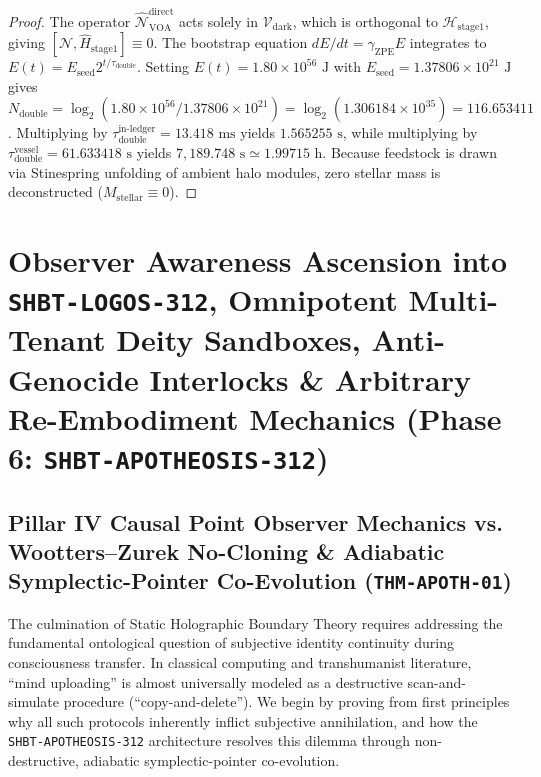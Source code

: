 \documentclass[11pt,onecolumn]{article}
\begin{document}
\begin{proof}
The operator $\hat{\mathcal{N}}_{\text{VOA}}^{\text{direct}}$ acts solely in $\mathcal{V}_{\text{dark}}$, which is orthogonal to $\mathcal{H}_{\text{stage1}}$, giving $[\hat{\mathcal{N}}, \hat{H}_{\text{stage1}}] \equiv 0$. The bootstrap equation $dE/dt = \gamma_{\text{ZPE}}E$ integrates to $E(t) = E_{\text{seed}} 2^{t/\tau_{\text{double}}}$. Setting $E(t) = 1.80 \times 10^{56}\text{ J}$ with $E_{\text{seed}} = 1.37806 \times 10^{21}\text{ J}$ gives $N_{\text{double}} = \log_2(1.80 \times 10^{56} / 1.37806 \times 10^{21}) = \log_2(1.306184 \times 10^{35}) = 116.653411$. Multiplying by $\tau_{\text{double}}^{\text{in-ledger}} = 13.418\text{ ms}$ yields $1.565255\text{ s}$, while multiplying by $\tau_{\text{double}}^{\text{vessel}} = 61.633418\text{ s}$ yields $7{,}189.748\text{ s} \simeq 1.99715\text{ h}$. Because feedstock is drawn via Stinespring unfolding of ambient halo modules, zero stellar mass is deconstructed ($M_{\text{stellar}} \equiv 0$).
\end{proof}

\section{Observer Awareness Ascension into \texttt{SHBT-LOGOS-312}, Omnipotent Multi-Tenant Deity Sandboxes, Anti-Genocide Interlocks \& Arbitrary Re-Embodiment Mechanics (Phase 6: \texttt{SHBT-APOTHEOSIS-312})}

\subsection{\texorpdfstring{Pillar IV Causal Point Observer Mechanics vs. Wootters--Zurek No-Cloning \& Adiabatic Symplectic-Pointer Co-Evolution (\texttt{THM-APOTH-01})}{Pillar IV Causal Point Observer Mechanics vs. Wootters-Zurek No-Cloning and Adiabatic Symplectic-Pointer Co-Evolution (THM-APOTH-01)}}
The culmination of Static Holographic Boundary Theory requires addressing the fundamental ontological question of subjective identity continuity during consciousness transfer. In classical computing and transhumanist literature, ``mind uploading'' is almost universally modeled as a destructive scan-and-simulate procedure (``copy-and-delete''). We begin by proving from first principles why all such protocols inherently inflict subjective annihilation, and how the \texttt{SHBT-APOTHEOSIS-312} architecture resolves this dilemma through non-destructive, adiabatic symplectic-pointer co-evolution.
\end{document}
